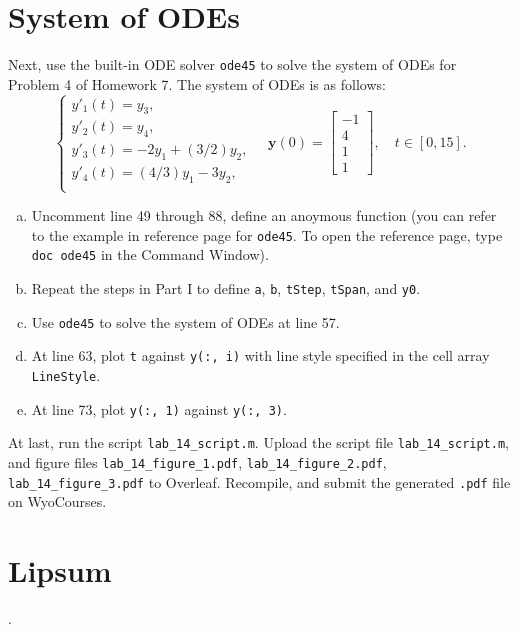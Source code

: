 \documentclass[11pt]{lab-exercise}
\begin{document}
\section{System of ODEs}
Next, use the built-in ODE solver \verb`ode45` to solve the system of ODEs for Problem 4 of Homework 7. The system of ODEs is as follows:
$$
\begin{cases}
    y'_1(t) = y_3, \\
    y'_2(t) = y_4, \\
    y'_3(t) = -2 y_1 + (3/2) y_2, \\
    y'_4(t) = (4/3) y_1 - 3 y_2, \\
\end{cases}
\quad
\mathbf{y}(0) =
\begin{bmatrix}
    -1 \\ 4 \\ 1 \\ 1
\end{bmatrix},
\quad
t \in [0, 15].
$$
\begin{enumerate}[a.]
    \item Uncomment line 49 through 88, define an anoymous function (you can refer to the example in reference page for \verb`ode45`. To open the reference page, type \verb`doc ode45` in the Command Window).
    \item Repeat the steps in Part I to define \verb`a`, \verb`b`, \verb`tStep`, \verb`tSpan`, and \verb`y0`.
    \item Use \verb`ode45` to solve the system of ODEs at line 57.
    \item At line 63, plot \verb`t` against \verb`y(:, i)` with line style specified in the cell array \verb`LineStyle`.
    \item At line 73, plot \verb`y(:, 1)` against \verb`y(:, 3)`.
\end{enumerate}
At last, run the script \verb|lab_14_script.m|. Upload the script file \verb|lab_14_script.m|, and figure files \verb|lab_14_figure_1.pdf|, \verb|lab_14_figure_2.pdf|, \verb|lab_14_figure_3.pdf| to Overleaf. Recompile, and submit the generated \verb|.pdf| file on WyoCourses.

\section{Lipsum}
\lipsum.
\end{document}
